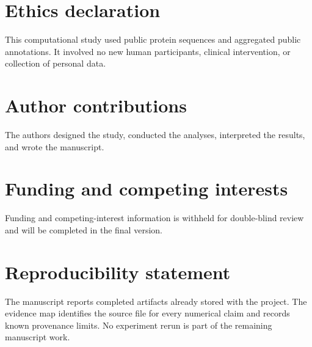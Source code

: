 \documentclass{article}
\begin{document}
\section*{Ethics declaration}
This computational study used public protein sequences and aggregated public
annotations. It involved no new human participants, clinical intervention, or
collection of personal data.

\section*{Author contributions}
The authors designed the study, conducted the analyses, interpreted the
results, and wrote the manuscript.

\section*{Funding and competing interests}
Funding and competing-interest information is withheld for double-blind
review and will be completed in the final version.

\section*{Reproducibility statement}
The manuscript reports completed artifacts already stored with the project.
The evidence map identifies the source file for every numerical claim and
records known provenance limits. No experiment rerun is part of the remaining
manuscript work.



\end{document}

